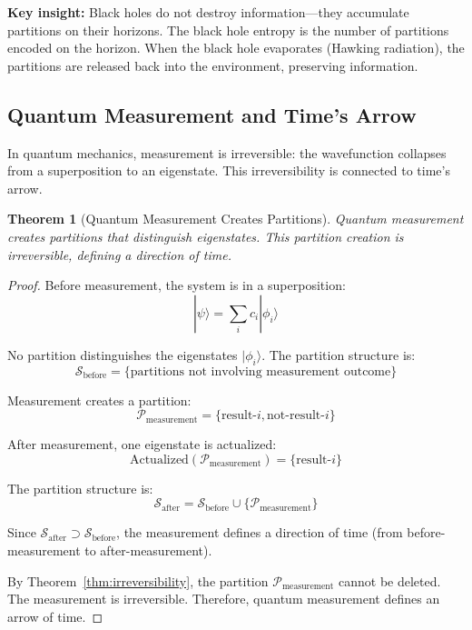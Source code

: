 \documentclass[twocolumn,10pt]{article}
\newtheorem{theorem}{Theorem}[section]
\theoremstyle{definition}
\theoremstyle{remark}
\begin{document}
\noindent\textbf{Key insight:} Black holes do not destroy information—they accumulate partitions on their horizons. The black hole entropy is the number of partitions encoded on the horizon. When the black hole evaporates (Hawking radiation), the partitions are released back into the environment, preserving information.

\subsection{Quantum Measurement and Time's Arrow}

In quantum mechanics, measurement is irreversible: the wavefunction collapses from a superposition to an eigenstate. This irreversibility is connected to time's arrow.

\begin{theorem}[Quantum Measurement Creates Partitions]
\label{thm:quantum_measurement_creates_partitions}
Quantum measurement creates partitions that distinguish eigenstates. This partition creation is irreversible, defining a direction of time.
\end{theorem}

\begin{proof}
Before measurement, the system is in a superposition:
\begin{equation}
|\psi\rangle = \sum_i c_i |\phi_i\rangle
\end{equation}

No partition distinguishes the eigenstates $|\phi_i\rangle$. The partition structure is:
\begin{equation}
\mathcal{S}_{\text{before}} = \{\text{partitions not involving measurement outcome}\}
\end{equation}

Measurement creates a partition:
\begin{equation}
\mathcal{P}_{\text{measurement}} = \{\text{result-}i, \text{not-result-}i\}
\end{equation}

After measurement, one eigenstate is actualized:
\begin{equation}
\text{Actualized}(\mathcal{P}_{\text{measurement}}) = \{\text{result-}i\}
\end{equation}

The partition structure is:
\begin{equation}
\mathcal{S}_{\text{after}} = \mathcal{S}_{\text{before}} \cup \{\mathcal{P}_{\text{measurement}}\}
\end{equation}

Since $\mathcal{S}_{\text{after}} \supset \mathcal{S}_{\text{before}}$, the measurement defines a direction of time (from before-measurement to after-measurement).

By Theorem~\ref{thm:irreversibility}, the partition $\mathcal{P}_{\text{measurement}}$ cannot be deleted. The measurement is irreversible. Therefore, quantum measurement defines an arrow of time.
\end{proof}
\end{document}
